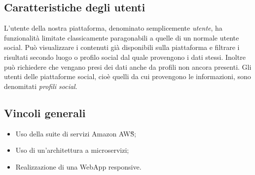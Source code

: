 \subsection{Caratteristiche degli utenti}
L'utente della nostra piattaforma, denominato semplicemente \textit{utente}, ha funzionalità limitate classicamente paragonabili a quelle di un normale utente social.
Può visualizzare i contenuti già disponibili sulla piattaforma e filtrare i risultati secondo luogo o profilo social dal quale provengono i dati stessi.
Inoltre può richiedere che vengano presi dei dati anche da profili non ancora presenti.
Gli utenti delle piattaforme social, cioè quelli da cui provengono le informazioni, sono denomitati \textit{profili social}.

\subsection{Vincoli generali}
\begin{itemize}
	\item Uso della suite di servizi Amazon AWS\G{};
	\item Uso di un'architettura a microservizi;
	\item Realizzazione di una WebApp responsive.
\end{itemize}
